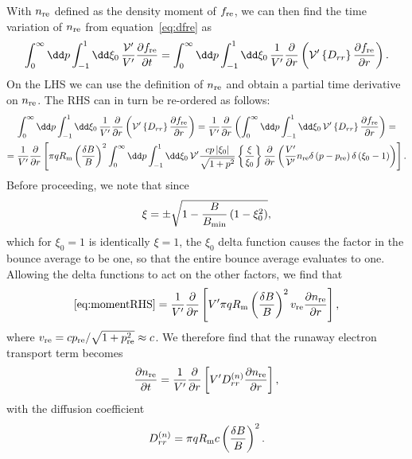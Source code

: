 \documentclass{notes}
\newcommand{\Vp}{\mathcal{V}'}
\begin{document}
	With $n_{\rm re}$ defined as the density moment of $f_{\rm re}$, we can then
	find the time variation of $n_{\rm re}$ from equation~\eqref{eq:dfre} as
	\begin{equation}
		\int_0^\infty\dd p\int_{-1}^1\dd\xi_0\,\frac{\Vp}{V'}\frac{\partial f_{\rm re}}{\partial t} =
		\int_0^\infty\dd p\int_{-1}^1\dd\xi_0\,\frac{1}{V'}\frac{\partial}{\partial r}\left(
			\Vp \left\{D_{rr}\right\}\frac{\partial f_{\rm re}}{\partial r}
		\right).
	\end{equation}
	On the LHS we can use the definition of $n_{\rm re}$ and obtain a partial
	time derivative on $n_{\rm re}$. The RHS can in turn be re-ordered as
	follows:
	\begin{equation}\label{eq:momentRHS}
		\begin{gathered}
			\int_0^\infty\dd p\int_{-1}^1\dd\xi_0\,\frac{1}{V'}\frac{\partial}{\partial r}\left(
				\Vp \left\{D_{rr}\right\}\frac{\partial f_{\rm re}}{\partial r}
			\right) =
			\frac{1}{V'}\frac{\partial}{\partial r}\left(
				\int_0^\infty\dd p\int_{-1}^1\dd\xi_0\,
				\Vp\left\{ D_{rr} \right\} \frac{\partial f_{\rm re}}{\partial r}
			\right) =\\
			=
			\frac{1}{V'}\frac{\partial}{\partial r}\left[
				\pi q R_{\rm m}\left(
					\frac{\delta B}{B}
				\right)^2
				\int_0^\infty\dd p\int_{-1}^1\dd\xi_0\,
				\Vp \frac{cp\left|\xi_0\right|}{\sqrt{1+p^2}}
				\left\{\frac{\xi}{\xi_0}\right\}
				\frac{\partial}{\partial r}\left(
					\frac{V'}{\Vp}
					n_{\rm re}
					\delta\left(p-p_{\rm re}\right)
					\delta\left(\xi_0-1\right)
				\right)
			\right].
		\end{gathered}
	\end{equation}
	Before proceeding, we note that since
	\begin{equation}
		\xi = \pm\sqrt{1 - \frac{B}{B_{\rm min}}\left(1-\xi_0^2\right)},
	\end{equation}
	which for $\xi_0=1$ is identically $\xi=1$, the $\xi_0$ delta function
	causes the factor in the bounce average to be one, so that the entire bounce
	average evaluates to one. Allowing the delta functions to act on the other
	factors, we find that
	\begin{equation}
		\eqref{eq:momentRHS} =
			\frac{1}{V'}\frac{\partial}{\partial r}\left[
				V'\pi q R_{\rm m}
				\left(\frac{\delta B}{B}\right)^2
				v_{\rm re}
				\frac{\partial n_{\rm re}}{\partial r}
			\right],
	\end{equation}
	where $v_{\rm re}=cp_{\rm re}/\sqrt{1+p_{\rm re}^2}\approx c$. We therefore
	find that the runaway electron transport term becomes
	\begin{equation}
		\frac{\partial n_{\rm re}}{\partial t} =
			\frac{1}{V'}\frac{\partial}{\partial r}\left[
				V' D_{rr}^{(n)} \frac{\partial n_{\rm re}}{\partial r}
			\right],
	\end{equation}
	with the diffusion coefficient
	\begin{equation}
		D_{rr}^{(n)} =
			\pi q R_{\rm m}c\left(\frac{\delta B}{B}\right)^2.
	\end{equation}
\end{document}
